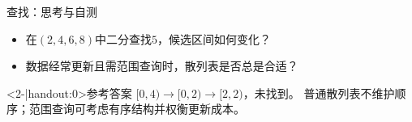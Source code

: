\begin{frame}{查找：思考与自测}
    \begin{itemize}
        \item 在$(2,4,6,8)$中二分查找$5$，候选区间如何变化？
        \item 数据经常更新且需范围查询时，散列表是否总是合适？
    \end{itemize}
    \pause
    \begin{block}<2-|handout:0>{参考答案}
        $[0,4)\rightarrow[0,2)\rightarrow[2,2)$，未找到。
        普通散列表不维护顺序；范围查询可考虑有序结构并权衡更新成本。
    \end{block}
\end{frame}

